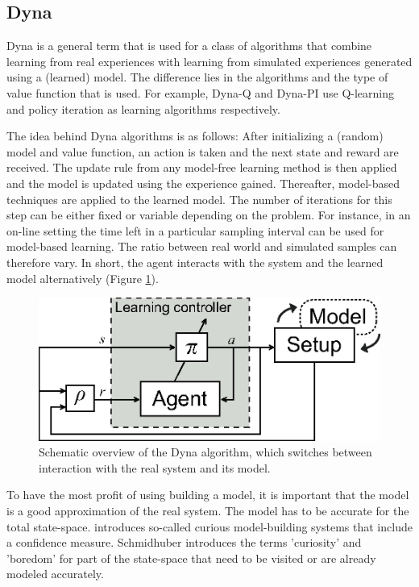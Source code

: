 \documentclass[a4paper,11pt]{mscLiterature}
\begin{document}
	\subsection{Dyna} \label{sec:dyna}
	Dyna is a general term that is used for a class of algorithms that combine learning from real experiences with learning from simulated experiences generated using a (learned) model. The difference lies in the algorithms and the type of value function that is used. For example, Dyna-Q and Dyna-PI use Q-learning and policy iteration as learning algorithms respectively.
	
	The idea behind Dyna algorithms is as follows: After initializing a (random) model and value function, an action is taken and the next state and reward are received. The update rule from any model-free learning method is then applied and the model is updated using the experience gained. Thereafter, model-based techniques are applied to the learned model. The number of iterations for this step can be either fixed or variable depending on the problem. For instance, in an on-line setting the time left in a particular sampling interval can be used for model-based learning. The ratio between real world and simulated samples can therefore vary. In short, the agent interacts with the system and the learned model alternatively (Figure \ref{fig:DynaFramework}).
	\begin{figure}[htbp]
	\centering
		\includegraphics[width=300 pt]{img/DynaFramework}
	\caption{Schematic overview of the Dyna algorithm, which switches between interaction with the real system and its model.}
	\label{fig:DynaFramework}
\end{figure}

	To have the most profit of using building a model, it is important that the model is a good approximation of the real system. The model has to be accurate for the total state-space. \cite{Schmidhuber:91} introduces so-called curious model-building systems that include a confidence measure. Schmidhuber introduces the terms 'curiosity' and 'boredom' for part of the state-space that need to be visited or are already modeled accurately.
	
\end{document}
